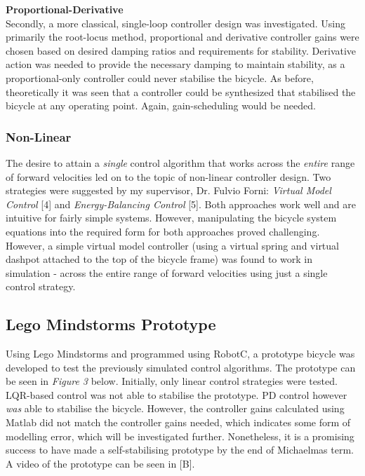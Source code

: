 \documentclass[12pt]{article}
\begin{document}
\noindent \textbf{Proportional-Derivative} \\
Secondly, a more classical, single-loop controller design was investigated. Using primarily the root-locus method, proportional and derivative controller gains were chosen based on desired damping ratios and requirements for stability. Derivative action was needed to provide the necessary damping to maintain stability, as a proportional-only controller could never stabilise the bicycle. As before, theoretically it was seen that a controller could be synthesized that stabilised the bicycle at any operating point. Again, gain-scheduling would be needed.

\subsubsection{Non-Linear}
The desire to attain a \textit{single} control algorithm that works across the \textit{entire} range of forward velocities led on to the topic of non-linear controller design. Two strategies were suggested by my supervisor, Dr. Fulvio Forni: \textit{Virtual Model Control} [4] and \textit{Energy-Balancing Control} [5]. Both approaches work well and are intuitive for fairly simple systems. However, manipulating the bicycle system equations into the required form for both approaches proved challenging. However, a simple virtual model controller (using a virtual spring and virtual dashpot attached to the top of the bicycle frame) was found to work in simulation - across the entire range of forward velocities using just a single control strategy.

\subsection{Lego Mindstorms Prototype}
Using Lego Mindstorms and programmed using RobotC, a prototype bicycle was developed to test the previously simulated control algorithms. The prototype can be seen in \textit{Figure 3} below. Initially, only linear control strategies were tested. LQR-based control was not able to stabilise the prototype. PD control however \textit{was} able to stabilise the bicycle. However, the controller gains calculated using Matlab did not match the controller gains needed, which indicates some form of modelling error, which will be investigated further. Nonetheless, it is a promising success to have made a self-stabilising prototype by the end of Michaelmas term.
A video of the prototype can be seen in [B].
\end{document}
